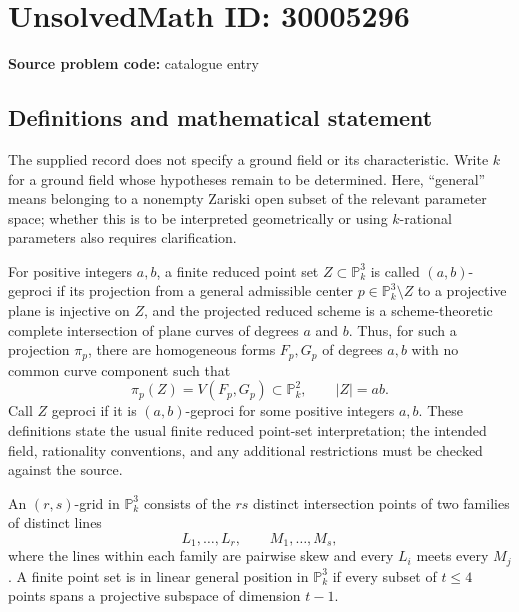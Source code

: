 \documentclass[11pt]{article}
\newcommand{\PP}{\mathbb{P}}
\begin{document}
\section*{UnsolvedMath ID: 30005296}
\textbf{Source problem code:} catalogue entry
\subsection{Definitions and mathematical statement}
The supplied record does not specify a ground field or its characteristic. Write \(k\) for a ground field whose hypotheses remain to be determined. Here, ``general'' means belonging to a nonempty Zariski open subset of the relevant parameter space; whether this is to be interpreted geometrically or using \(k\)-rational parameters also requires clarification.

For positive integers \(a,b\), a finite reduced point set \(Z\subset\PP^3_k\) is called \((a,b)\)-geproci if its projection from a general admissible center \(p\in\PP^3_k\setminus Z\) to a projective plane is injective on \(Z\), and the projected reduced scheme is a scheme-theoretic complete intersection of plane curves of degrees \(a\) and \(b\). Thus, for such a projection \(\pi_p\), there are homogeneous forms \(F_p,G_p\) of degrees \(a,b\) with no common curve component such that
\[
\pi_p(Z)=V(F_p,G_p)\subset\PP^2_k,
\qquad |Z|=ab.
\]
Call \(Z\) geproci if it is \((a,b)\)-geproci for some positive integers \(a,b\). These definitions state the usual finite reduced point-set interpretation; the intended field, rationality conventions, and any additional restrictions must be checked against the source.

An \((r,s)\)-grid in \(\PP^3_k\) consists of the \(rs\) distinct intersection points of two families of distinct lines
\[
L_1,\ldots,L_r,\qquad M_1,\ldots,M_s,
\]
where the lines within each family are pairwise skew and every \(L_i\) meets every \(M_j\). A finite point set is in linear general position in \(\PP^3_k\) if every subset of \(t\leq4\) points spans a projective subspace of dimension \(t-1\).
\end{document}
